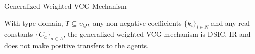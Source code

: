 \begin{frame}{Generalized Weighted VCG Mechanism}
\begin{theorem}[ ]
With type domain, $\Upsilon \subseteq \upsilon _{QL}$ any non-negative coefficients $\{k_{i}\}_{i \in N}$ and any real constants $\{C_{a}\}_{a \in A}$, the generalized weighted VCG mechanism is DSIC, IR and does not make positive transfers to the agents.
\end{theorem}

\end{frame}
